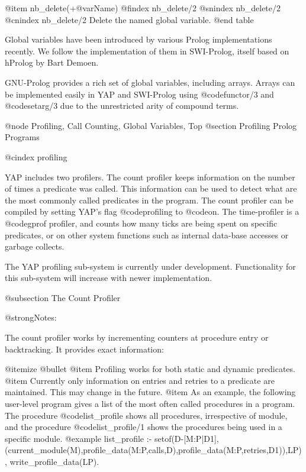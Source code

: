 {{{{{{{@item nb_delete(+@var{Name}) 
@findex nb_delete/2
@snindex nb_delete/2
@cnindex nb_delete/2
Delete the named global variable. 
@end table

Global variables have been introduced by various Prolog
implementations recently. We follow the implementation of them in
SWI-Prolog, itself based on hProlog by Bart Demoen.

GNU-Prolog provides a rich set of global variables, including
arrays. Arrays can be implemented easily in YAP and SWI-Prolog using
@code{functor/3} and @code{setarg/3} due to the unrestricted arity of
compound terms.


@node Profiling, Call Counting, Global Variables, Top
@section Profiling Prolog Programs

@cindex profiling

YAP includes two profilers. The count profiler keeps information on the
number of times a predicate was called. This information can be used to
detect what are the most commonly called predicates in the program.  The
count profiler can be compiled by setting YAP's flag @code{profiling}
to @code{on}. The time-profiler is a @code{gprof} profiler, and counts
how many ticks are being spent on specific predicates, or on other
system functions such as internal data-base accesses or garbage collects.

The YAP profiling sub-system is currently under
development. Functionality for this sub-system will increase with newer
implementation.

@subsection The Count Profiler

@strong{Notes:}

The count profiler works by incrementing counters at procedure entry or
backtracking. It provides exact information:

@itemize @bullet
@item Profiling works for both static and dynamic predicates.
@item Currently only information on entries and retries to a predicate
are maintained. This may change in the future.
@item As an example, the following user-level program gives a list of
the most often called procedures in a program. The procedure
@code{list_profile} shows all procedures, irrespective of module, and
the procedure @code{list_profile/1} shows the procedures being used in
a specific module.
@example
list_profile :-
        setof(D-[M:P|D1],(current_module(M),profile_data(M:P,calls,D),profile_data(M:P,retries,D1)),LP),
        write_profile_data(LP).

}}}}}}}

